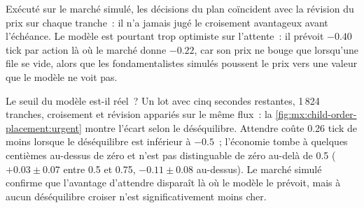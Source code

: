 \begin{omfigure}

\label{fig:mx:child-order-placement:threshold}
\end{omfigure}

\label{lst:mx:child-order-placement:policy}

Exécuté sur le marché simulé, les décisions du plan coïncident avec la révision du prix sur chaque tranche~: il n'a jamais jugé le croisement avantageux avant l'échéance.
Le modèle est pourtant trop optimiste sur l'attente~: il prévoit $-0.40$ tick par action là où le marché donne $-0.22$, car son prix ne bouge que
lorsqu'une file se vide, alors que les fondamentalistes simulés poussent le prix vers une valeur que le modèle ne voit pas.

Le seuil du modèle est-il réel~? Un lot avec cinq secondes restantes, 1\,824 tranches, croisement et révision appariés sur le même flux~:
la \cref{fig:mx:child-order-placement:urgent} montre l'écart selon le déséquilibre. Attendre coûte 0.26 tick de moins lorsque le déséquilibre est inférieur à $-0.5$~; l'économie
tombe à quelques centièmes au-dessus de zéro et n'est pas distinguable de zéro au-delà de 0.5 ($+0.03\pm0.07$ entre 0.5 et 0.75, $-0.11\pm0.08$
au-dessus). Le marché simulé confirme que l'avantage d'attendre disparaît là où le modèle le prévoit, mais à aucun déséquilibre croiser n'est significativement
moins cher.

